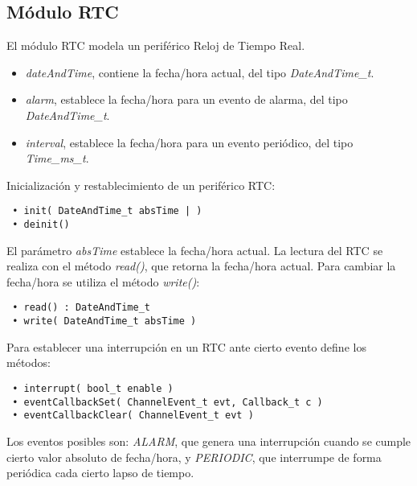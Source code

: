 \subsection{Módulo RTC}

El módulo RTC modela un periférico Reloj de Tiempo Real.


\begin{itemize}
\item
\emph{dateAndTime}, contiene la fecha/hora actual, del tipo \emph{DateAndTime\_t}.
\item
\emph{alarm}, establece la fecha/hora para un evento de alarma, del tipo \emph{DateAndTime\_t}.
\item
\emph{interval}, establece la fecha/hora para un evento periódico, del tipo \emph{Time\_ms\_t}.
\end{itemize}


Inicialización y restablecimiento de un periférico RTC:

\begin{verbatim}
 • init( DateAndTime_t absTime | )
 • deinit()
\end{verbatim}

El parámetro \emph{absTime} establece la fecha/hora actual. La lectura del RTC se realiza con el método \emph{read()}, que retorna la fecha/hora actual. Para cambiar la fecha/hora se utiliza el método \emph{write()}:

\begin{verbatim}
 • read() : DateAndTime_t
 • write( DateAndTime_t absTime )
\end{verbatim}

Para establecer una interrupción en un RTC ante cierto evento define los métodos: 

\begin{verbatim}
 • interrupt( bool_t enable )
 • eventCallbackSet( ChannelEvent_t evt, Callback_t c )
 • eventCallbackClear( ChannelEvent_t evt )
\end{verbatim}

Los eventos posibles son: \emph{ALARM}, que genera una interrupción cuando se cumple cierto valor absoluto de fecha/hora, y \emph{PERIODIC}, que interrumpe de forma periódica cada cierto lapso de tiempo.
